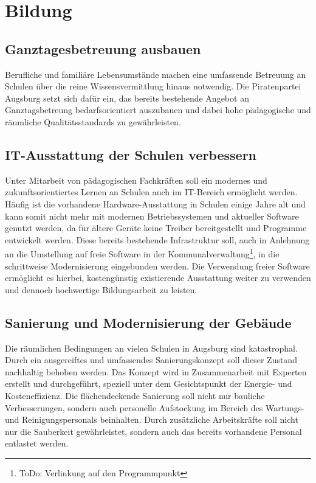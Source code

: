 \chapter{Bildung}
  
  \section{Ganztagesbetreuung ausbauen}
  
  Berufliche und familiäre Lebensumstände machen eine umfassende Betreuung an 
  Schulen über die reine Wissensvermittlung hinaus notwendig. Die 
  Piratenpartei Augsburg setzt sich dafür ein, das bereits bestehende Angebot 
  an Ganztagsbetreung bedarfsorientiert auszubauen und dabei hohe pädagogische 
  und räumliche Qualitätsstandards zu gewährleisten.
  
  \section{IT-Ausstattung der Schulen verbessern}
  
  Unter Mitarbeit von pädagogischen Fachkräften soll ein modernes und 
  zukunftsorientiertes Lernen an Schulen auch im IT-Bereich ermöglicht werden. 
  Häufig ist die vorhandene Hardware-Ausstattung in Schulen einige Jahre alt 
  und kann somit nicht mehr mit modernen Betriebssystemen und aktueller 
  Software genutzt werden, da für ältere Geräte keine Treiber bereitgestellt 
  und Programme entwickelt werden. Diese bereits bestehende Infrastruktur 
  soll, auch in Anlehnung an die Umstellung auf freie Software in der 
  Kommunalverwaltung\footnote{ToDo: Verlinkung auf den Programmpunkt}, in die 
  schrittweise Modernisierung eingebunden werden. Die Verwendung freier 
  Software ermöglicht es hierbei, kostengünstig existierende Ausstattung 
  weiter zu verwenden und dennoch hochwertige Bildungsarbeit zu leisten.
  
  \section{Sanierung und Modernisierung der Gebäude}
  
  Die räumlichen Bedingungen an vielen Schulen in Augsburg sind katastrophal. 
  Durch ein ausgereiftes und umfassendes Sanierungskonzept soll dieser Zustand 
  nachhaltig behoben werden. Das Konzept wird in Zusammenarbeit mit Experten 
  erstellt und durchgeführt, speziell unter dem Gesichtspunkt der Energie- und 
  Kosteneffizienz. Die flächendeckende Sanierung soll nicht nur bauliche 
  Verbesserungen, sondern auch personelle Aufstockung im Bereich des Wartungs- 
  und Reinigungspersonals beinhalten. Durch zusätzliche Arbeitskräfte soll 
  nicht nur die Sauberkeit gewährleistet, sondern auch das bereits vorhandene 
  Personal entlastet werden.
  

